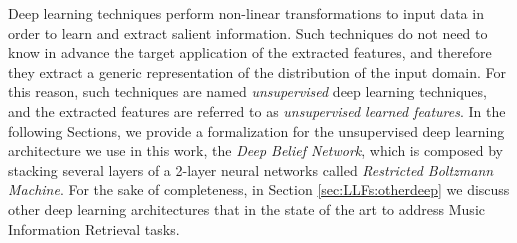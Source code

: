 Deep learning techniques perform non-linear transformations to input data in order to learn and extract salient information. Such techniques do not need to know in advance the target application of the extracted features, and therefore they extract a generic representation of the distribution of the input domain. For this reason, such techniques are named \textit{unsupervised} deep learning techniques, and the extracted features are referred to as \textit{unsupervised learned features}. 
In the following Sections, we provide a formalization for the unsupervised deep learning architecture we use in this work, the \textit{Deep Belief Network}, which is composed by stacking several layers of a 2-layer neural networks called \textit{Restricted Boltzmann Machine}. For the sake of completeness, in Section \ref{sec:LLFs:otherdeep} we discuss other deep learning architectures that  in the state of the art to address Music Information Retrieval tasks.


%


